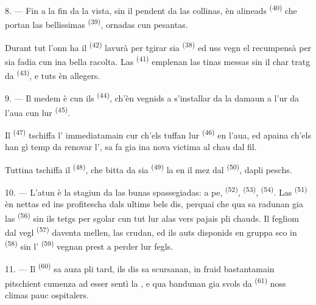 8. --- Fin a la fin da la vista, sin il pendent da las collinas, èn alineads
 \textsuperscript{(40)} che portan las bellissimas  \textsuperscript{(39)}, ornadas cun  pesantas.

Durant tut l'onn ha il  \textsuperscript{(42)} lavurà per tgirar sia
 \textsuperscript{(38)} ed uss vegn el recumpensà per sia fadia cun ina
bella racolta. Las  \textsuperscript{(41)} emplenan las tinas
messas sin il char tratg da  \textsuperscript{(43)}, e tuts èn allegers.

\VUsaut{5.0mm}
\VUsaut{3.4mm}

9. --- Il medem è cun ils  \textsuperscript{(44)}, ch'èn
vegnids a s'installar da la damaun a l'ur da l'aua cun lur 
\textsuperscript{(45)}.

Il  \textsuperscript{(47)} tschiffa l' immediatamain cur ch'els
tuffan lur  \textsuperscript{(46)} en l'aua, ed apaina ch'els han gì temp
da renovar l', sa fa gia ina nova victima al chau dal fil.

Tuttina tschiffa il  \textsuperscript{(48)}, che bitta da
sia  \textsuperscript{(49)} la  en il mez dal
 \textsuperscript{(50)}, dapli peschs.

10. --- L'atun è la stagiun da las bunas spassegiadas: a pe, 
\textsuperscript{(52)},  \textsuperscript{(53)}, 
\textsuperscript{(54)}. Las  \textsuperscript{(51)} èn nettas ed ins
profitescha dals ultims bels dis, perquai che qua sa radunan gia las
 \textsuperscript{(56)} sin ils tetgs per sgolar cun tut lur alas
vers pajais pli chauds. Il fegliom dal vegl  \textsuperscript{(57)}
daventa mellen, las  crudan, ed ils auts  disponids en
gruppa sco in  \textsuperscript{(58)} sin l'
\textsuperscript{(59)} vegnan prest a perder lur fegls.

11. --- Il  \textsuperscript{(60)} sa auza pli tard, ils dis sa
scursanan, in fraid bastantamain pitschient cumenza ad esser sentì la ,
e qua bandunan gia svols da  \textsuperscript{(61)} noss climas pauc
ospitalers.

\VUsaut{6.0mm}
\VUfilet{22mm}
